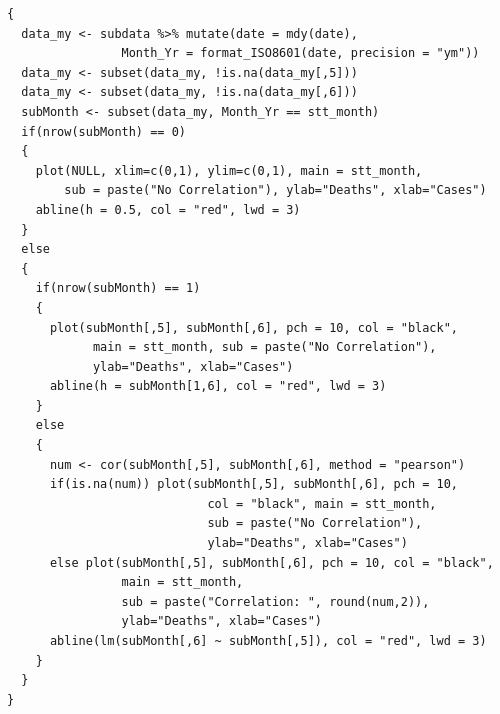 \documentclass[a4paper]{article}
\theoremstyle{definition}
\begin{document}
\begin{enumerate}[i)]
\begin{enumerate}[1)]
\begin{lstlisting}[frame=single]
{
  data_my <- subdata %>% mutate(date = mdy(date),
                Month_Yr = format_ISO8601(date, precision = "ym"))
  data_my <- subset(data_my, !is.na(data_my[,5]))
  data_my <- subset(data_my, !is.na(data_my[,6]))
  subMonth <- subset(data_my, Month_Yr == stt_month)
  if(nrow(subMonth) == 0)
  {
    plot(NULL, xlim=c(0,1), ylim=c(0,1), main = stt_month, 
        sub = paste("No Correlation"), ylab="Deaths", xlab="Cases")
    abline(h = 0.5, col = "red", lwd = 3)
  }
  else
  {
    if(nrow(subMonth) == 1)
    {
      plot(subMonth[,5], subMonth[,6], pch = 10, col = "black", 
            main = stt_month, sub = paste("No Correlation"), 
            ylab="Deaths", xlab="Cases")
      abline(h = subMonth[1,6], col = "red", lwd = 3)
    }
    else 
    {
      num <- cor(subMonth[,5], subMonth[,6], method = "pearson")
      if(is.na(num)) plot(subMonth[,5], subMonth[,6], pch = 10, 
                            col = "black", main = stt_month, 
                            sub = paste("No Correlation"), 
                            ylab="Deaths", xlab="Cases")
      else plot(subMonth[,5], subMonth[,6], pch = 10, col = "black", 
                main = stt_month, 
                sub = paste("Correlation: ", round(num,2)), 
                ylab="Deaths", xlab="Cases")
      abline(lm(subMonth[,6] ~ subMonth[,5]), col = "red", lwd = 3)
    }
  }
}


\end{lstlisting}
\end{enumerate}
\end{enumerate}
\end{document}
